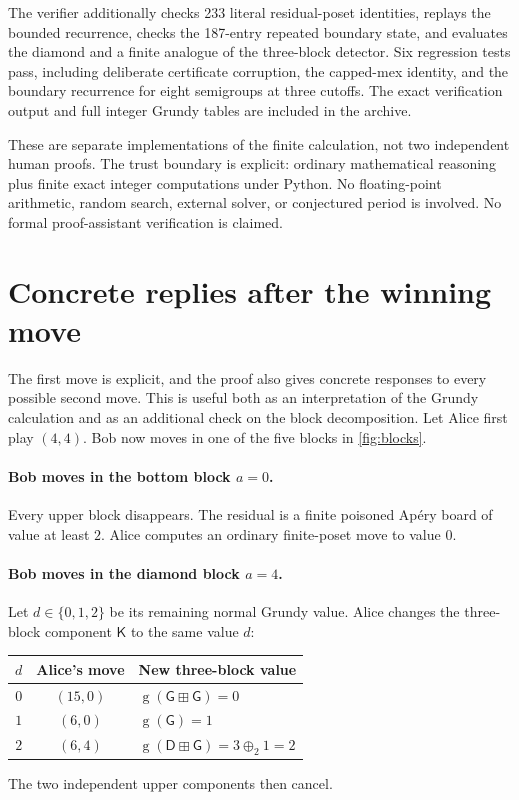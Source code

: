 \documentclass[11pt,letterpaper]{article}
\numberwithin{equation}{section}
\theoremstyle{definition}
\newcommand{\Gr}{\operatorname{g}}
\newcommand{\ps}{\mathbin{\boxplus}}
\newcommand{\xo}{\mathbin{\oplus_{\!2}}}
\renewcommand{\Game}{\mathsf G}
\newcommand{\DiamondGame}{\mathsf D}
\newcommand{\KGame}{\mathsf K}
\begin{document}
The verifier additionally checks 233 literal residual-poset identities,
replays the bounded recurrence, checks the 187-entry repeated boundary
state, and evaluates the diamond and a finite analogue of the three-block
detector. Six regression tests pass, including deliberate certificate
corruption, the capped-mex identity, and the boundary recurrence for eight
semigroups at three cutoffs. The exact verification output and full integer
Grundy tables are included in the archive.

These are separate implementations of the finite calculation, not two
independent human proofs. The trust boundary is explicit: ordinary
mathematical reasoning plus finite exact integer computations under Python.
No floating-point arithmetic, random search, external solver, or conjectured
period is involved. No formal proof-assistant verification is claimed.

\section{Concrete replies after the winning move}
\label{sec:replies}

The first move is explicit, and the proof also gives concrete responses to
every possible second move. This is useful both as an interpretation of the
Grundy calculation and as an additional check on the block decomposition.
Let Alice first play $(4,4)$. Bob now moves in one of the five blocks in
\cref{fig:blocks}.

\paragraph{Bob moves in the bottom block $a=0$.}
Every upper block disappears. The residual is a finite poisoned Ap\'ery
board of value at least $2$. Alice computes an ordinary finite-poset move
to value $0$.

\paragraph{Bob moves in the diamond block $a=4$.}
Let $d\in\{0,1,2\}$ be its remaining normal Grundy value. Alice changes the
three-block component $\KGame$ to the same value $d$:
\begin{center}
\begin{tabular}{ccl}
\toprule
$d$ & Alice's move & New three-block value\\
\midrule
$0$ & $(15,0)$ & $\Gr(\Game\ps\Game)=0$\\
$1$ & $(6,0)$ & $\Gr(\Game)=1$\\
$2$ & $(6,4)$ & $\Gr(\DiamondGame\ps\Game)=3\xo1=2$\\
\bottomrule
\end{tabular}
\end{center}
The two independent upper components then cancel.
\end{document}

